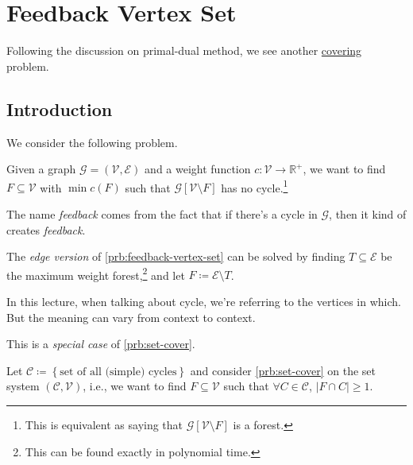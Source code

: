 \section{Feedback Vertex Set}
Following the discussion on primal-dual method, we see another \hyperref[def:covering]{covering} problem.

\subsection{Introduction}
We consider the following problem.

\begin{problem}\label{prb:feedback-vertex-set}
Given a graph \(\mathcal{G} = (\mathcal{V} , \mathcal{E} )\) and a weight function \(c\colon \mathcal{V} \to \mathbb{R} ^+\), we want to find \(F\subseteq \mathcal{V} \) with \(\min c(F)\) such that \(\mathcal{G} [\mathcal{V} \setminus F]\) has no cycle.\footnote{This is equivalent as saying that \(\mathcal{G} [\mathcal{V} \setminus F]\) is a forest.}
\end{problem}

\begin{note}[Feedback]
	The name \emph{feedback} comes from the fact that if there's a cycle in \(\mathcal{G} \), then it kind of creates \emph{feedback}.
\end{note}

\begin{note}
	The \emph{edge version} of \autoref{prb:feedback-vertex-set} can be solved by finding \(T\subseteq \mathcal{E} \) be the maximum weight forest,\footnote{This can be found exactly in polynomial time.} and let \(F \coloneqq \mathcal{E} \setminus T\).
\end{note}

\begin{notation}
	In this lecture, when talking about cycle, we're referring to the vertices in which. But the meaning can vary from context to context.
\end{notation}

\begin{remark}
	This is a \emph{special case} of \autoref{prb:set-cover}.
\end{remark}
\begin{explanation}
	Let \(\mathcal{C} \coloneqq \left\{ \text{set of all (simple) cycles}  \right\}\) and consider \autoref{prb:set-cover} on the set system \((\mathcal{C} , \mathcal{V} )\), i.e., we want to find \(F\subseteq \mathcal{V} \) such that \(\forall C\in \mathcal{C} \), \(\left\vert F \cap C \right\vert \geq 1\).
\end{explanation}

